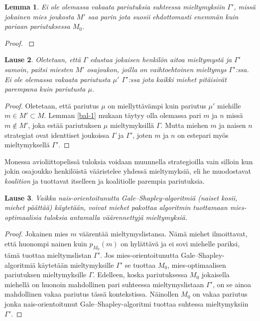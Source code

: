 \documentclass[finnish]{tktltiki2}
\newtheorem{lau}{Lause}
\newtheorem{lem}[lau]{Lemma}
\theoremstyle{definition}
\theoremstyle{remark}
\begin{document}
\begin{lem}\cite[s. 56]{gusfield1989stable}\label{strategy-gus}
	Ei ole olemassa vakaata pariutuksia suhteessa mieltymyksiin $\Gamma'$, missä jokainen mies joukosta $M'$ saa parin jota suosii ehdottomasti enemmän kuin pariaan pariutuksessa $M_0$.
\end{lem}

\begin{proof}\cite[s. 56]{gusfield1989stable}
	
\end{proof}



\begin{lau}\cite[p, 593]{Balinski}
	Oletetaan, että $\Gamma$ edustaa jokaisen henkilön aitoa mieltymystä ja $\Gamma'$ samoin, paitsi miesten $M'$ osajoukon, joilla on vaihtoehtoinen mieltymys $\Gamma'$:ssa. Ei ole olemassa vakaata pariutusta $\mu'$ $\Gamma'$:ssa jota kaikki miehet pitäisivät parempana kuin pariutusta $\mu$.
\end{lau}
\begin{proof}
	Oletetaan, että pariutus $\mu$ on miellyttävämpi kuin pariutus $\mu'$ miehille $m \in M' \subset M$. Lemman \ref{bal-1} mukaan täytyy olla olemassa pari $m$ ja $n$ missä $m \notin M'$, joka estää pariutuksen $\mu$ mieltymyksillä $\Gamma$. Mutta miehen $m$ ja naisen $n$ strategiat ovat identtiset joukoissa $\Gamma$ ja $\Gamma'$, joten $m$ ja $n$ on estepari myös mieltymyksellä $\Gamma'$.
\end{proof}

Monessa avioliittopelissä tuloksia voidaan muunnella strategioilla vain silloin kun jokin osajoukko henkilöistä vääristelee yhdessä mieltymyksiä, eli he muodostavat \emph{koalition} ja tuottavat itselleen ja koalitiolle parempia pariutuksia.

\begin{lau}\cite[p, 58]{gusfield1989stable}
	Vaikka nais-orientoitunutta Gale--Shapley-algoritmiä (naiset kosii, miehet päättää) käytetään, voivat miehet pakottaa algoritmin tuottamaan mies-optimaalisia tuloksia antamalla väärennettyjä mieltymyksiä.
\end{lau}

\begin{proof}
	Jokainen mies $m$ väärentää mieltymyslistansa. Nämä miehet ilmoittavat, että huonompi nainen kuin $p_{M_0}(m)$ on hylättävä ja ei sovi miehelle pariksi, tämä tuottaa mieltymslistan $\Gamma'$. Jos mies-orientoitunutta Gale--Shapley-algoritmiä käytetään mieltymyksille $\Gamma'$ se tuottaa $M_0$, mies-optimaalisen pariutuksen mieltymyksille $\Gamma$. Edelleen, koska pariutuksessa $M_0$ jokaisella miehellä on huonoin mahdollinen pari suhteessa mieltymyslistaan $\Gamma'$, on se ainoa mahdollinen vakaa pariutus tässä kontekstissa. Näinollen $M_0$ on vakaa pariutus jonka nais-orientoitunut Gale--Shapley-algoritmi tuottaa suhtessa mieltymyksiin $\Gamma'$.
\end{proof}
\end{document}
